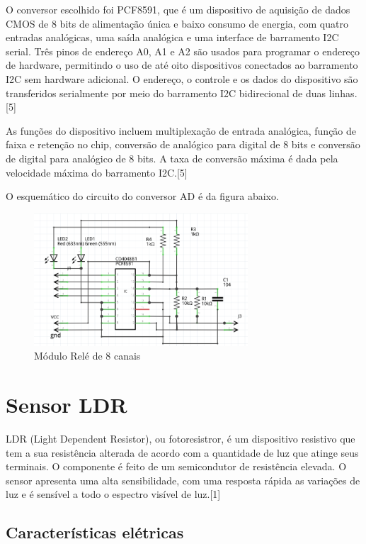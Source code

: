 O conversor escolhido foi PCF8591, que é um dispositivo de aquisição de dados CMOS de 8 bits de alimentação única e baixo consumo de energia, com quatro entradas analógicas, uma saída analógica e uma interface de barramento I2C serial. Três pinos de endereço A0, A1 e A2 são usados para programar o endereço de hardware, permitindo o uso de até oito dispositivos conectados ao barramento I2C sem hardware adicional. O endereço, o controle e os dados do dispositivo são transferidos serialmente por meio do barramento I2C bidirecional de duas linhas\cite{nxp2013}.[5]

As funções do dispositivo incluem multiplexação de entrada analógica, função de faixa e retenção no chip, conversão de analógico para digital de 8 bits e conversão de digital para analógico de 8 bits. A taxa de conversão máxima é dada pela velocidade máxima do barramento I2C\cite{nxp2013}.[5]

O esquemático do circuito do conversor AD é da figura abaixo.

\begin{figure}[H]
	\centering
	\includegraphics[width=8cm]{figuras/circuito_1.png}
	\caption{Módulo Relé de 8 canais} \label{circuito_1}
\end{figure}


\section{Sensor LDR}

LDR (Light Dependent Resistor), ou fotoresistror, é um dispositivo resistivo que tem a sua resistência alterada de acordo com a quantidade de luz que atinge seus terminais. O componente é feito de um semicondutor de resistência elevada. O sensor apresenta uma alta sensibilidade, com uma resposta rápida as variações de luz e é sensível a todo o espectro visível de luz\cite{ahmad2016}.[1]

\subsection{Características elétricas}

